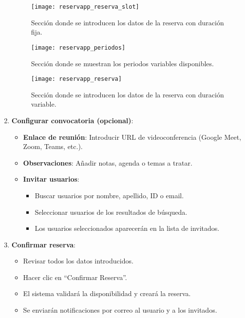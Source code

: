 \begin{enumerate}
   \begin{figure}[H]
	\centering
		\texttt{[image: reservapp\_reserva\_slot]}
	\caption{Sección donde se introducen los datos de la reserva con duración fija.}
	\label{fig:reservapp_reserva_slot}
   \end{figure}

   \begin{figure}[H]
	\centering
	\texttt{[image: reservapp\_periodos]}
	\caption{Sección donde se muestran los periodos variables disponibles.}
	\label{fig:reservapp_periodos}
\end{figure}

   \begin{figure}[H]
	\centering
		\texttt{[image: reservapp\_reserva]}
	\caption{Sección donde se introducen los datos de la reserva con duración variable.}
	\label{fig:reservapp_reserva}
   \end{figure}

   \item \textbf{Configurar convocatoria (opcional)}:
   \begin{itemize}
      \item \textbf{Enlace de reunión}: Introducir URL de videoconferencia (Google Meet, Zoom, Teams, etc.).
      \item \textbf{Observaciones}: Añadir notas, agenda o temas a tratar.
      \item \textbf{Invitar usuarios}:
      \begin{itemize}
         \item Buscar usuarios por nombre, apellido, ID o email.
         \item Seleccionar usuarios de los resultados de búsqueda.
         \item Los usuarios seleccionados aparecerán en la lista de invitados.
      \end{itemize}
   \end{itemize}
   \item \textbf{Confirmar reserva}:
   \begin{itemize}
      \item Revisar todos los datos introducidos.
      \item Hacer clic en ``Confirmar Reserva''.
      \item El sistema validará la disponibilidad y creará la reserva.
      \item Se enviarán notificaciones por correo al usuario y a los invitados.
   \end{itemize}
\end{enumerate}

